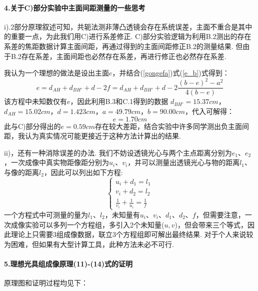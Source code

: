 \documentclass[UTF8]{ctexart}
\begin{document}
\paragraph{4.\quad 关于C)部分实验中主面间距测量的一些思考}\quad\par
i).2部分原理叙述可知，共轭法测非薄凸透镜会存在系统误差，主面不重合是其中的重要一点，为此我们用C)进行系差修正. C)部分实验逻辑为利用B.2测出的存在系差的焦距数据计算主面间距，再通过得到的主面间距修正B.2的测量结果. 但由于B.2存在系差，主面间距也必然存在系差，再进行修正也必然存在系差.\par
我认为一个理想的做法是设出主面$e$，并结合(\ref{gongefa})式(\ref{e_b})式得到：
\begin{equation}
    e=d_{AH}+d_{BH'}+d-2f=d_{AH}+d_{BH'}+d-2\frac{(b-e)^2-a^2}{4(b-e)}
\end{equation}
该方程中未知数仅有$e$，因此利用B.3和C.1得到的数据
$d_{BH'}=15.37cm$，$d_{AH}=15.02cm$，$d=1.423cm$，$a=49.79cm$，$b=90.00cm$，代入可解得：
\[e=1.70cm\]
此与C)部分得出的$e=0.59cm$存在较大差距，结合实验中许多同学测出负主面间距，我认为真实情况可能更接近于这种方法计算出的结果.\par\vspace{2em}
ii)，还有一种消除误差的办法. 我们不妨设透镜光心与两个主点距离分别为$e_1$、$e_2$，一次成像中真实物距像距分别为$u_i$、$v_i$，并可以测量出透镜光心与物的距离$l_1$、与像的距离$l_2$，因此可以列出如下方程:
\begin{equation}
    \begin{cases}
        u_i+d_1=l_1\\
        v_i+d_2=l_2\\
        \frac{1}{v_i}+\frac{1}{u_i}=\frac{1}{f}
    \end{cases}
\end{equation}
一个方程式中可测量的量为$l_1$、$l_2$，未知量有$u_i$、$v_i$、$d_1$、$d_2$、$f$，但需要注意，一次成像实验可以多列一个方程组，多引入2个未知量($u, v$)，但会带来三个等式，因此理论上只需要3组成像数据，联立3个方程组即可解出最终结果. 对于个人来说较为困难，但如果有大型计算工具，此种方法未必不可行.\par

\paragraph{5.\quad 理想光具组成像原理(11)-(14)式的证明}\quad\par
原理图和证明过程均见下：
\end{document}
